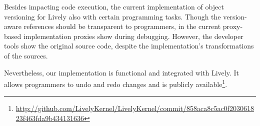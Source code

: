 Besides impacting code execution, the current implementation of object versioning for Lively also  with certain programming tasks.
Though the version-aware references should be transparent to programmers, in the current proxy-based implementation proxies show during debugging.
However, the developer tools show the original source code, despite the implementation's transformations of the sources.

Nevertheless, our implementation is functional and integrated with Lively.
It allows programmers to undo and redo changes and is publicly available\footnote{\url{http://github.com/LivelyKernel/LivelyKernel/commit/858aca8c5ac0f203061823f463fda9b434131636}}.
